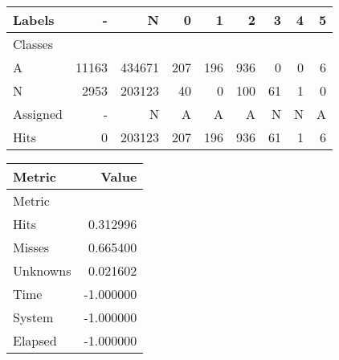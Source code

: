 \begin{tabular}{l|r|r|r|r|r|r|r|r}

Labels &      - &       N &    0 &    1 &    2 &   3 &  4 &  5 \\\hline
Classes  &        &         &      &      &      &     &    &    \\\hline
\hline
A        &  11163 &  434671 &  207 &  196 &  936 &   0 &  0 &  6 \\\hline
N        &   2953 &  203123 &   40 &    0 &  100 &  61 &  1 &  0 \\\hline
\hline
Assigned &      - &       N &    A &    A &    A &   N &  N &  A \\\hline
Hits     &      0 &  203123 &  207 &  196 &  936 &  61 &  1 &  6 
\end{tabular}
\begin{tabular}{l|r}

Metric   &     Value \\\hline
Metric   &           \\\hline
\hline
Hits     &  0.312996 \\\hline
Misses   &  0.665400 \\\hline
Unknowns &  0.021602 \\\hline
Time     & -1.000000 \\\hline
System   & -1.000000 \\\hline
Elapsed  & -1.000000 
\end{tabular}
